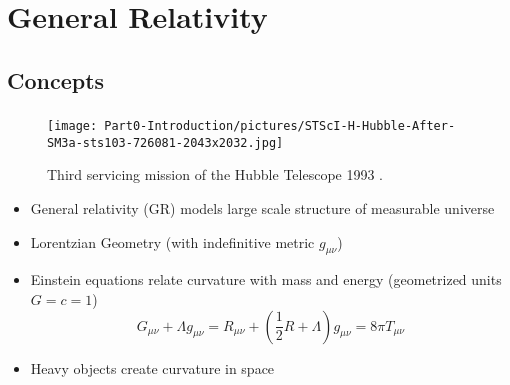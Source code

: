 \section{General Relativity}

\subsection{Concepts}
\begin{frame}
	\frametitle{\insertsubsection}
	\begin{minipage}{0.3\textwidth}
		\begin{figure}
			\centering
			\texttt{[image: Part0-Introduction/pictures/STScI-H-Hubble-After-SM3a-sts103-726081-2043x2032.jpg]}
			\vspace{0.15cm}
			\caption{Third servicing mission of the Hubble Telescope 1993 \cite{nasaHubbleSiteImageHubble1999}.}
		\end{figure}
	\end{minipage}%
	\begin{minipage}{0.7\textwidth}
		\begin{itemize}[<+->]
			\item General relativity (GR) models large scale structure of measurable universe
			\item Lorentzian Geometry (with indefinitive metric $g_{\mu\nu}$)
			\item Einstein equations relate curvature with mass and energy (geometrized units $G=c=1$)
			\[G_{\mu\nu} + \Lambda g_{\mu\nu}=R_{\mu\nu}+\left(\frac{1}{2}R+\Lambda\right)g_{\mu\nu}=8\pi T_{\mu\nu}\]
			\item Heavy objects create curvature in space
		\end{itemize}
	\end{minipage}
\end{frame}


